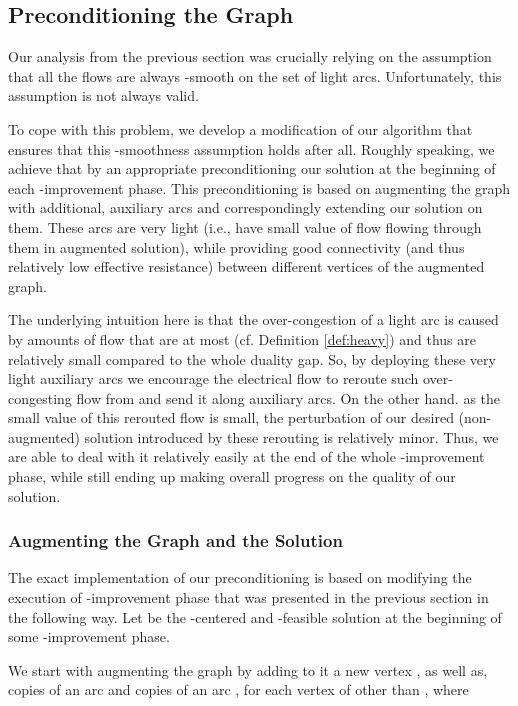 \documentclass[11pt, letterpaper]{article}
\begin{document}
\subsection{Preconditioning the Graph \texorpdfstring{}{G}}\label{sec:preconditioning}


Our analysis from the previous section was crucially relying on the assumption that all the flows  are always -smooth on the set of light arcs. Unfortunately, this assumption is not always valid. 

To cope with this problem, we develop a modification of our algorithm that ensures that this -smoothness assumption holds after all. Roughly speaking, we achieve that by an appropriate preconditioning our solution at the beginning of each -improvement phase. This preconditioning is based on augmenting the graph  with additional, auxiliary arcs and correspondingly extending our solution on them. These arcs are very light (i.e., have small value  of flow flowing through them in augmented solution), while providing good connectivity (and thus relatively low effective resistance) between different vertices of the augmented graph. 

The underlying intuition here is that the over-congestion of a light arc  is caused by amounts of flow that are at most  (cf. Definition \eqref{def:heavy}) and thus are relatively small compared to the whole duality gap. So, by deploying these very light auxiliary arcs we encourage the electrical flow  to reroute such over-congesting flow from  and send it along auxiliary arcs. On the other hand. as the small value of this rerouted flow is small, the perturbation of our desired (non-augmented) solution introduced by these rerouting is relatively minor. Thus, we are able to deal with it relatively easily at the end of the whole -improvement phase, while still ending up making overall progress on the quality of our solution. 

\subsubsection*{Augmenting the Graph and the Solution}

The exact implementation of our preconditioning is based on modifying the execution of -improvement phase that was presented in the previous section in the following way. Let  be the  -centered and -feasible solution at the beginning of some -improvement phase. 

We start with augmenting the graph  by adding to it a new vertex , as well as,  copies of an arc  and  copies of an arc , for each vertex  of  other than , where
\end{document}
